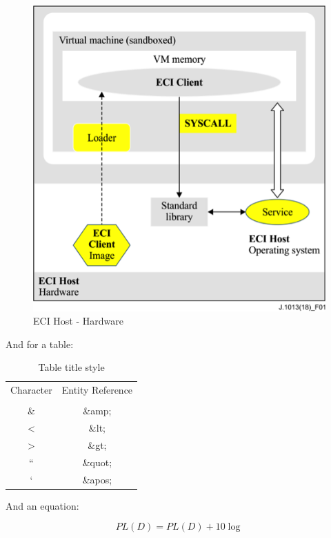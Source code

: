 \documentclass[10pt,a4paper,twocolumn]{article}
\begin{document}
\begin{figure}
	\includegraphics[width=\columnwidth]{Figure1}
	\caption{ECI Host - Hardware}
	\label{fig:ECIhost} 
\end{figure}


And for a table:

\begin{table}
	\centering
	\caption{Table title style}\label{tab:tab1} 
	\begin{small}
	\begin{tabular}{|c|c|}
		\hline
		Character & Entity Reference\\ 
		& \\
		\hline
		\hline
		\& & \&amp; \\
		\hline
		< & \&lt;\\
		\hline
		> & \&gt; \\
		\hline
		``  & \&quot; \\
		\hline
		` & \&apos; \\
		\hline
	\end{tabular}
	\end{small}
\end{table}


And an equation:

\begin{equation}\label{eq:PL}
	PL(D)=PL(D)+10\log 
\end{equation}
\end{document}
